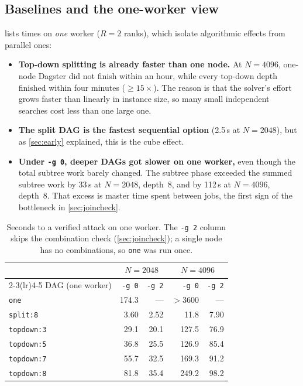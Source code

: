 \documentclass[11pt,a4paper]{article}
\newcommand{\dfam}[1]{\texttt{#1}}
\newcommand{\opt}[1]{\texttt{#1}}
\begin{document}
\subsection{Baselines and the one-worker view}
\label{sec:baselines}
 lists times on \emph{one} worker ($R=2$ ranks), which isolate
algorithmic effects from parallel ones:
\begin{itemize}
\item \textbf{Top-down splitting is already faster than one node.} At $N=4096$, one-node
      Dagster did not finish within an hour, while every top-down depth finished within
      four minutes ($\ge 15\times$). The reason is that the solver's effort grows faster
      than linearly in instance size, so many small independent searches cost less than
      one large one.
\item \textbf{The split DAG is the fastest sequential option} (2.5\,s at $N=2048$), but as
      \cref{sec:early} explained, this is the cube effect.
\item \textbf{Under \opt{-g 0}, deeper DAGs got slower on one worker,} even though the
      total subtree work barely changed. The subtree phase exceeded the summed subtree work
      by 33\,s at $N=2048$, depth~8, and by 112\,s at $N=4096$, depth~8. That excess is
      master time spent between jobs, the first sign of the bottleneck in
      \cref{sec:joincheck}.
\end{itemize}

\begin{table}[htbp]
\centering\small
\begin{tabular}{@{}lrrrr@{}}
\toprule
& \multicolumn{2}{c}{$N=2048$} & \multicolumn{2}{c}{$N=4096$} \\
\cmidrule(lr){2-3}\cmidrule(lr){4-5}
DAG (one worker) & \opt{-g 0} & \opt{-g 2} & \opt{-g 0} & \opt{-g 2} \\
\midrule
\dfam{one}        & 174.3 & --- & $>3600$ & --- \\
\dfam{split:8}    & 3.60 & 2.52 & 11.8 & 7.90 \\
\dfam{topdown:3}  & 29.1 & 20.1 & 127.5 & 76.9 \\
\dfam{topdown:5}  & 36.8 & 25.5 & 126.9 & 85.4 \\
\dfam{topdown:7}  & 55.7 & 32.5 & 169.3 & 91.2 \\
\dfam{topdown:8}  & 81.8 & 35.4 & 249.2 & 98.2 \\
\bottomrule
\end{tabular}
\caption{Seconds to a verified attack on one worker. The \opt{-g 2} column skips the
combination check (\cref{sec:joincheck}); a single node has no combinations, so \dfam{one}
was run once.}
\label{tab:oneworker}
\end{table}
\end{document}
